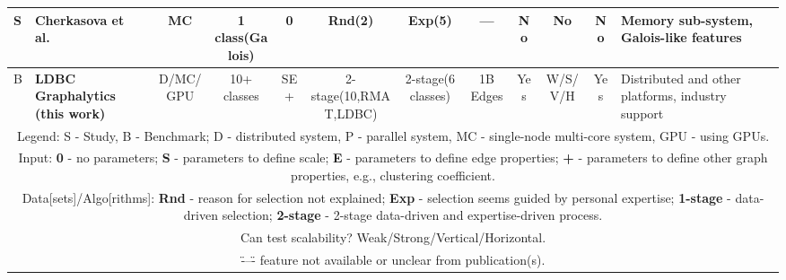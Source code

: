 \begin{tabular}[!tb]{|l|l|l|l|l|l|l|l|l|l|l|l|}
\hline
S & Cherkasova et al.~\cite{conf/icpe/EisenmanCMCFK16} & \multicolumn{1}{c|}{MC} & \multicolumn{1}{c|}{1 class(Galois)} & \multicolumn{1}{c|}{0} & \multicolumn{1}{c|}{Rnd(2)} & \multicolumn{1}{c|}{Exp(5)} & \multicolumn{1}{c|}{---} & \multicolumn{1}{c|}{No} & \multicolumn{1}{c|}{No} & \multicolumn{1}{c|}{No} & Memory sub-system, Galois-like features \\ 
\hline
B & {\bf LDBC Graphalytics (this work)} & \multicolumn{1}{c|}{D/MC/GPU} & \multicolumn{1}{c|}{10+ classes} & \multicolumn{1}{c|}{SE+} & \multicolumn{1}{c|}{2-stage(10,RMAT,LDBC)} & \multicolumn{1}{c|}{2-stage(6 classes)} & \multicolumn{1}{c|}{1B Edges} & \multicolumn{1}{c|}{Yes} & \multicolumn{1}{c|}{W/S/V/H} & \multicolumn{1}{c|}{Yes} & Distributed and other platforms, industry support \\ 
\hline
\multicolumn{12}{|c|}{Legend: S - Study, B - Benchmark; D - distributed system, P - parallel system, MC - single-node multi-core system, GPU - using GPUs.} \\ 
\hline
\multicolumn{12}{|c|}{Input: {\bf 0} - no parameters; {\bf S} - parameters to define scale; {\bf E} - parameters to define edge properties; {\bf +} - parameters to define other graph properties, e.g., clustering coefficient.} \\ 
\hline
\multicolumn{12}{|c|}{Data[sets]/Algo[rithms]: {\bf Rnd} - reason for selection not explained; {\bf Exp} - selection seems guided by personal expertise; {\bf 1-stage} - data-driven selection; {\bf 2-stage} - 2-stage data-driven and expertise-driven process.} \\ 
\hline
\multicolumn{12}{|c|}{Can test scalability? Weak/Strong/Vertical/Horizontal.} \\ 
\hline
\multicolumn{12}{|c|}{\"---\" - feature not available or unclear from publication(s).} \\ 
\hline
\end{tabular}